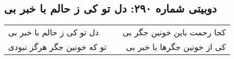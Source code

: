 \begin{center}
\section*{دوبیتی شماره ۲۹۰: دل تو کی ز حالم با خبر بی}
\label{sec:290}
\begin{longtable}{l p{0.5cm} r}
دل تو کی ز حالم با خبر بی
&&
کجا رحمت باین خونین جگر بی
\\
تو که خونین جگر هرگز نبودی
&&
کی از خونین جگرها با خبر بی
\\
\end{longtable}
\end{center}
